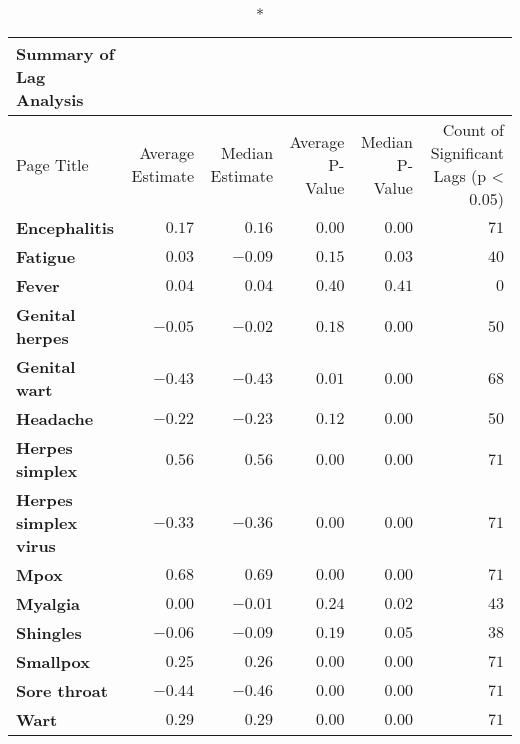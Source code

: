 \begin{longtable}{lrrrrr}
\caption*{
{\large \textbf{Summary of Lag Analysis}}
} \\ 
\toprule
Page Title & Average Estimate & Median Estimate & Average P-Value & Median P-Value & Count of Significant Lags (p < 0.05) \\ 
\midrule\addlinespace[2.5pt]
\textbf{Encephalitis} & $0.17$ & $0.16$ & $0.00$ & $0.00$ & $71$ \\ 
\textbf{Fatigue} & $0.03$ & $-0.09$ & $0.15$ & $0.03$ & $40$ \\ 
\textbf{Fever} & $0.04$ & $0.04$ & $0.40$ & $0.41$ & $0$ \\ 
\textbf{Genital herpes} & $-0.05$ & $-0.02$ & $0.18$ & $0.00$ & $50$ \\ 
\textbf{Genital wart} & $-0.43$ & $-0.43$ & $0.01$ & $0.00$ & $68$ \\ 
\textbf{Headache} & $-0.22$ & $-0.23$ & $0.12$ & $0.00$ & $50$ \\ 
\textbf{Herpes simplex} & $0.56$ & $0.56$ & $0.00$ & $0.00$ & $71$ \\ 
\textbf{Herpes simplex virus} & $-0.33$ & $-0.36$ & $0.00$ & $0.00$ & $71$ \\ 
\textbf{Mpox} & $0.68$ & $0.69$ & $0.00$ & $0.00$ & $71$ \\ 
\textbf{Myalgia} & $0.00$ & $-0.01$ & $0.24$ & $0.02$ & $43$ \\ 
\textbf{Shingles} & $-0.06$ & $-0.09$ & $0.19$ & $0.05$ & $38$ \\ 
\textbf{Smallpox} & $0.25$ & $0.26$ & $0.00$ & $0.00$ & $71$ \\ 
\textbf{Sore throat} & $-0.44$ & $-0.46$ & $0.00$ & $0.00$ & $71$ \\ 
\textbf{Wart} & $0.29$ & $0.29$ & $0.00$ & $0.00$ & $71$ \\ 
\bottomrule
\end{longtable}

